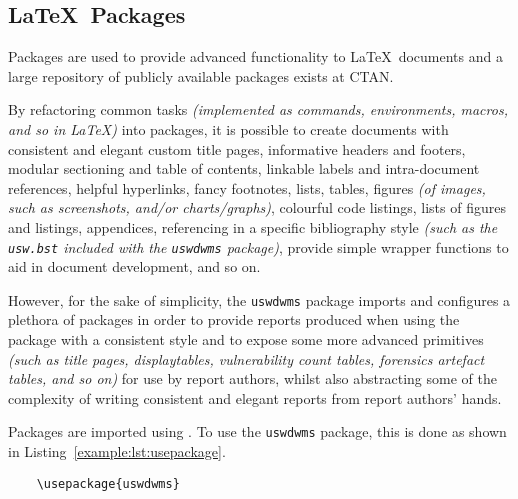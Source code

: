 \subsection{\LaTeX\ Packages}
Packages are used to provide advanced functionality to \LaTeX\ documents and a large repository of publicly available packages exists at CTAN.

By refactoring common tasks \textit{(implemented as commands, environments, macros, and so in \LaTeX{})} into packages, it is possible to create documents with consistent and elegant custom title pages, informative headers and footers, modular sectioning and table of contents, linkable labels and intra-document references, helpful hyperlinks, fancy footnotes, lists, tables, figures \textit{(of images, such as screenshots, and/or charts/graphs)}, colourful code listings, lists of figures and listings, appendices, referencing in a specific bibliography style \textit{(such as the \texttt{usw.bst} included with the \texttt{uswdwms} package)}, provide simple wrapper functions to aid in document development, and so on.

However, for the sake of simplicity, the \texttt{uswdwms} package imports and configures a plethora of packages in order to provide reports produced when using the package with a consistent style and to expose some more advanced primitives \textit{(such as title pages, displaytables, vulnerability count tables, forensics artefact tables, and so on)} for use by report authors, whilst also abstracting some of the complexity of writing consistent and elegant reports from report authors' hands.

Packages are imported using . To use the \texttt{uswdwms} package, this is done as shown in Listing~\ref{example:lst:usepackage}.


\begin{listing}[H]
  \captionsetup{skip=\skiplistingcaptionlen}
  \begin{verbatim}
    \usepackage{uswdwms}
  \end{verbatim}
  \caption{\LaTeX\ \texttt{\textbackslash usepackage} command example}
  \label{example:lst:usepackage}
\end{listing}
